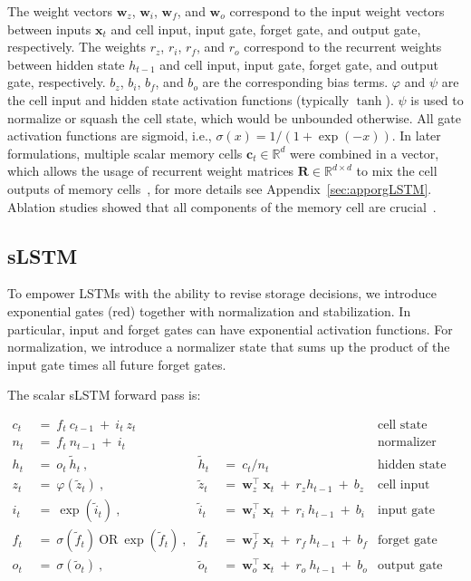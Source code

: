 The weight vectors $\mathbf{w}_{z}$, $\mathbf{w}_{i}$,
$\mathbf{w}_{f}$, and $\mathbf{w}_{o}$ correspond to the input weight vectors between inputs $\mathbf{x}_t$ and cell input, input gate, forget gate, and output gate, respectively. The weights $r_{z}$, $r_{i}$, $r_{f}$, and $r_{o}$ correspond to the recurrent weights between hidden state $h_{t-1}$ and cell input, input gate, forget gate, and output gate, respectively. $b_{z}$, $b_{i}$, $b_{f}$, and $b_{o}$ are the corresponding bias terms.
$\varphi$ and $\psi$ are the cell input and hidden state activation functions (typically $\tanh$). 
$\psi$ is used to normalize or squash the cell state, which would be unbounded otherwise. All gate activation functions are sigmoid, i.e.,
$\sigma \left( x \right)= 1/(1+\exp(-x))$.
In later formulations, multiple scalar memory cells $\mathbf{c}_t \in \mathbb{R}^{d}$ were combined in a vector, which allows the usage of recurrent weight matrices $\mathbf{R} \in \mathbb{R}^{d \times d}$ to mix the cell outputs of memory cells~\citep{Greff:15}, for more details see Appendix~\ref{sec:apporgLSTM}. 
Ablation studies showed that all components of the memory cell are crucial~\citep{Greff:15}. 

\subsection{sLSTM}
\label{sec:sLSTM}

To empower LSTMs with the ability to revise storage decisions, we introduce exponential gates (red) together with normalization and stabilization. In particular, input and forget gates can have exponential activation functions. For normalization, we introduce a normalizer state that sums up the product of the input gate times all future forget gates.

The scalar sLSTM forward pass is:

\begin{align}
\label{eq:slstmforward}
c_t \ &= \  f_t \ c_{t-1} \ + \ i_t \ z_t & & 
 &\text{cell state} \\
n_t \ &= \  f_t \ n_{t-1} \ + \ i_t  & & 
 &\text{normalizer state} \\
h_t \ &= \ o_t \ \tilde{h}_t \ ,
  &\tilde{h}_t \ &= \ c_t / n_t
&\text{hidden state} \\
z_t \ &= \ \varphi \left( \tilde{z}_t \right) \ , 
  &\tilde{z}_t \ &=  \ \mathbf{w}^\top_{z} \ \mathbf{x}_t \ + \
  r_{z}  h_{t-1} \ + \  b_{z}
  &\text{cell input} \\
i_t \ &= \ \!\exp \left( \tilde{i}_t  \right) \ , 
  &\tilde{i}_t \ &= \ \mathbf{w}^\top_{i} \ \mathbf{x}_t \ + \
  r_{i}  \ h_{t-1} \ + \  b_{i}
  &\text{input gate} \\
f_t \ &= \ \sigma \left(  \tilde{f}_t \right) \ \text{OR} \
\!\exp \left(  \tilde{f}_t \right) \ ,
  &\tilde{f}_t \ &= \ \mathbf{w}^\top_{f} \ \mathbf{x}_t  \ + \
  r_{f}  \ h_{t-1} \ + \  b_{f}
  &\text{forget gate} \\
o_t \ &= \ \sigma \left( \tilde{o}_t \right) \ , 
  &\tilde{o}_t  \ &= \ \mathbf{w}^\top_{o} \ \mathbf{x}_t \ + \
  r_{o}  \ h_{t-1} \ + \  b_{o}
  &\text{output gate} 
\end{align}

